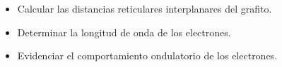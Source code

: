 \begin{itemize}
  \item Calcular las distancias reticulares interplanares del grafito.
  \item Determinar la longitud de onda de los electrones.
  \item Evidenciar el comportamiento ondulatorio de los electrones.
\end{itemize}

